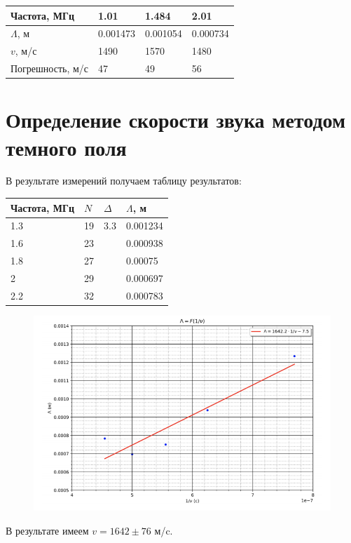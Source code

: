\documentclass[a4paper,12pt]{article}
\begin{document}
\begin{table}[h!]
	\begin{tabular}{|l|l|l|l|}
		\hline
		Частота, МГц     & 1.01     & 1.484    & 2.01     \\ \hline
		$\Lambda$, м      & 0.001473 & 0.001054 & 0.000734 \\ \hline
		$v$, м/с         & 1490     & 1570     & 1480     \\ \hline
		Погрешность, м/с & 47       & 49       & 56       \\ \hline
	\end{tabular}
\end{table}

\section{Определение скорости звука методом темного поля}

В результате измерений получаем таблицу результатов:

\begin{table}[h!]
	\begin{tabular}{|l|l|c|l|}
		\hline
		Частота, МГц & $N$ & \multicolumn{1}{l|}{$\Delta$} & $\Lambda$, м \\ \hline
		1.3          & 19  & 3.3         & 0.001234     \\ \cline{1-2} \cline{4-4} 
		1.6          & 23  &                              & 0.000938     \\ \cline{1-2} \cline{4-4} 
		1.8          & 27  &                              & 0.00075      \\ \cline{1-2} \cline{4-4} 
		2            & 29  &                              & 0.000697     \\ \cline{1-2} \cline{4-4} 
		2.2          & 32  &                              & 0.000783     \\ \hline
	\end{tabular}
\end{table}
\begin{figure}[h!]
	\begin{center}
		\includegraphics[scale = 0.67]{2.png}
	\end{center}
\end{figure}

В результате имеем $v = 1642 \pm 76$ м/c.
\end{document}
